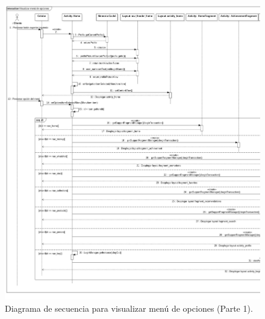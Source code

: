 \FloatBarrier
\begin{figure}[htbp!]
		\centering
			\includegraphics[width=1 \textwidth]{imagenes/Diagramas_UserApp/Nuevos_diagramas/visualizarMenu1}
		\caption{Diagrama de secuencia para visualizar menú de opciones (Parte 1).}
		\label{image:DSVisualizarMenu2}
\end{figure}
\FloatBarrier

